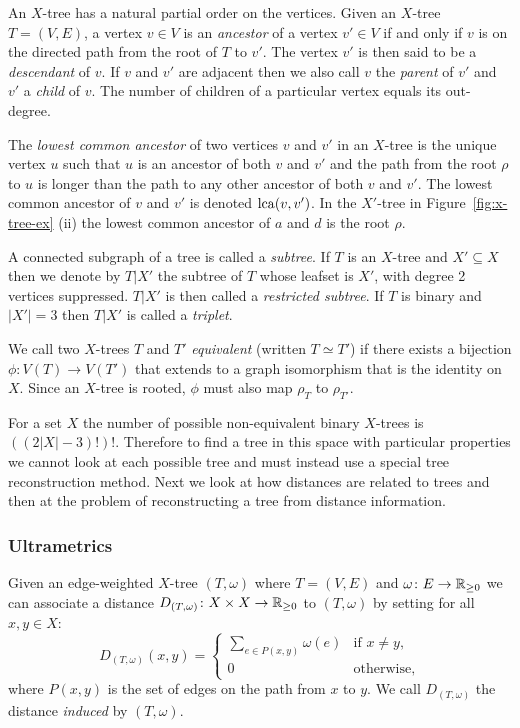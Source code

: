 An $X$-tree has a natural partial order on the vertices.  Given an $X$-tree
$T=(V,E)$, a vertex $v \in V$ is an \textit{ancestor} of a vertex $v' \in V$
if and only if $v$ is on the directed path from the root of $T$ to $v'$.  The
vertex $v'$ is then said to be a \textit{descendant} of $v$.  If $v$ and $v'$
are adjacent then we also call $v$ the \textit{parent} of $v'$ and $v'$ a
\textit{child} of $v$.  The number of children of a particular vertex equals
its out-degree.

The \textit{lowest common ancestor} of two vertices $v$ and $v'$ in an
$X$-tree is the unique vertex $u$ such that $u$ is an ancestor of both $v$ and
$v'$ and the path from the root $\rho$ to $u$ is longer than the path to any
other ancestor of both $v$ and $v'$.  The lowest common ancestor of $v$ and
$v'$ is denoted $\operatorname{lca}(v,v')$.  In the $X'$-tree in Figure~\ref{fig:x-tree-ex}
(ii) the lowest common ancestor of $a$ and $d$ is the root $\rho$.

A connected subgraph of a tree is called a \textit{subtree}.  If $T$ is an
$X$-tree and $X' \subseteq X$ then we denote by $T|X'$ the subtree of $T$
whose leafset is $X'$, with degree 2 vertices suppressed.  $T|X'$ is then
called a \textit{restricted subtree}.  If $T$ is binary and $|X'| = 3$ then
$T|X'$ is called a \textit{triplet}.

We call two $X$-trees $T$ and $T'$ \textit{equivalent} (written $T \simeq T'$)
if there exists a bijection $\phi \colon V(T) \to V(T')$ that extends to a
graph isomorphism that is the identity on $X$.  Since an $X$-tree is rooted,
$\phi$ must also map $\rho_{T}$ to $\rho_{T'}$.

For a set $X$ the number of possible non-equivalent binary $X$-trees is
$((2|X|-3)!)!$.  Therefore to find a tree in this space with particular
properties we cannot look at each possible tree and must instead use a special
tree reconstruction method.  Next we look at how distances are related to
trees and then at the problem of reconstructing a tree from distance
information.

\subsubsection{Ultrametrics}
\label{sec:ultrametrics}

Given an edge-weighted $X$-tree $(T,\omega)$ where $T=(V,E)$ and $\omega
\colon E \to {\mathbb R}_{\geq 0}$ we can associate a distance $D_{(T,\omega)} \colon X
\times X \to {\mathbb R}_{\geq 0}$ to $(T,\omega)$ by setting for all $x,y \in X$:
\begin{equation*}
  D_{(T,\omega)}(x,y) =
  \begin{cases}
    \displaystyle
    \sum_{e \in P(x,y)} \omega(e) & \text{if $x \neq y$},\\
    0 & \text{otherwise,}
  \end{cases}
\end{equation*}
where $P(x,y)$ is the set of edges on the path from $x$ to $y$.  We call
$D_{(T,\omega)}$ the distance \textit{induced} by $(T,\omega)$.  

